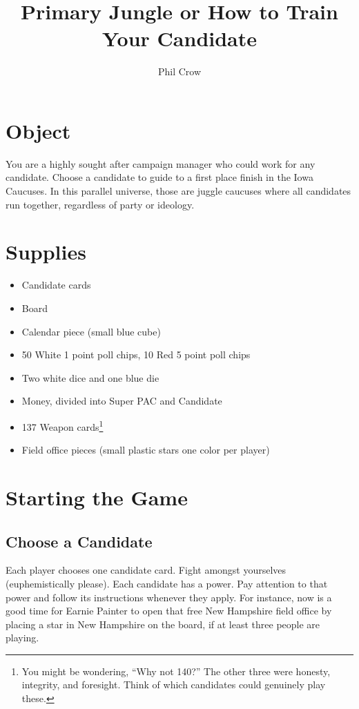 \documentclass[twocolumn]{article}
\begin{document}
\title{Primary Jungle or How to Train Your Candidate}
\author{Phil Crow}
\maketitle

\section{Object}

You are a highly sought after campaign manager who could work for any candidate. Choose a candidate to guide to a first place finish in
the Iowa Caucuses. In this parallel universe, those are juggle caucuses where all candidates run together, regardless of party or ideology.

\section{Supplies}

\begin{itemize}
\item Candidate cards
\item Board
\item Calendar piece (small blue cube)
\item 50 White 1 point poll chips, 10 Red 5 point poll chips
\item Two white dice and one blue die
\item Money, divided into Super PAC and Candidate
\item 137 Weapon cards\footnote{You might be wondering, ``Why not 140?'' The other three were honesty, integrity, and foresight. Think of which candidates could genuinely play these. }
\item Field office pieces (small plastic stars one color per player)
\end{itemize}

\section{Starting the Game}

\subsection{Choose a Candidate}

Each player chooses one candidate card. Fight amongst yourselves (euphemistically please). Each candidate has a power.
Pay attention to that power and follow its instructions whenever they apply. For instance, now is a good time for Earnie Painter to open that
free New Hampshire field office by placing a star in New Hampshire on the board, if at least three people are playing.
\end{document}
